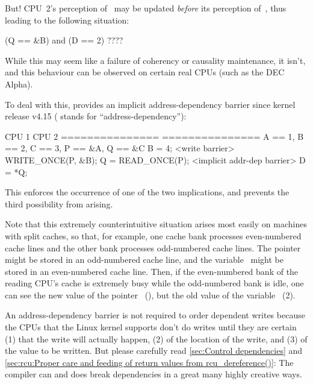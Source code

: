 But!
CPU~2's perception of~ may be updated \emph{before} its perception of~,
thus leading to the following situation:

\begin{VerbatimU}
	(Q == &B) and (D == 2) ????
\end{VerbatimU}

While this may seem like a failure of coherency or causality maintenance, it
isn't, and this behaviour can be observed on certain real CPUs (such as the DEC
Alpha).

To deal with this,  provides an implicit address-dependency
barrier since kernel release v4.15
( stands for ``address-dependency''):

\begin{VerbatimU}
	CPU 1                 CPU 2
	===============	      ===============
	{ A == 1, B == 2, C == 3, P == &A, Q == &C }
	B = 4;
	<write barrier>
	WRITE_ONCE(P, &B);
	                      Q = READ_ONCE(P);
	                      <implicit addr-dep barrier>
	                      D = *Q;
\end{VerbatimU}

This enforces the occurrence of one of the two implications, and prevents the
third possibility from arising.


\begin{Note}
Note that this extremely counterintuitive situation arises most easily on
machines with split caches, so that, for example, one cache bank processes
even-numbered cache lines and the other bank processes odd-numbered cache
lines.
The pointer~ might be stored in an odd-numbered cache line, and the
variable~ might be stored in an even-numbered cache line.
Then, if the even-numbered bank of the reading CPU's cache is extremely
busy while the odd-numbered bank is idle, one can see the new value of
the pointer~ (), but the old value of the variable~ (2).
\end{Note}


An address-dependency barrier is not required to order dependent writes
because the CPUs that the Linux kernel supports don't do writes until they
are certain (1) that the write will actually happen, (2) of the location of
the write, and (3) of the value to be written.
But please carefully read \cref{sec:Control dependencies} and
\cref{sec:rcu:Proper care and feeding of return values from rcu_dereference()}:
The compiler can and does break dependencies in a great many highly
creative ways.


